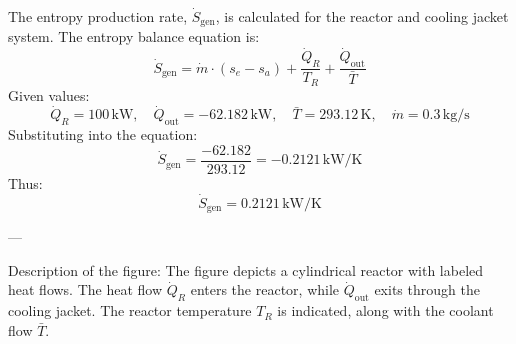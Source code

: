 The entropy production rate, \( \dot{S}_{\text{gen}} \), is calculated for the reactor and cooling jacket system. The entropy balance equation is:  
\[
\dot{S}_{\text{gen}} = \dot{m} \cdot (s_e - s_a) + \frac{\dot{Q}_R}{T_R} + \frac{\dot{Q}_{\text{out}}}{\bar{T}}
\]  
Given values:  
\[
\dot{Q}_R = 100 \, \text{kW}, \quad \dot{Q}_{\text{out}} = -62.182 \, \text{kW}, \quad \bar{T} = 293.12 \, \text{K}, \quad \dot{m} = 0.3 \, \text{kg/s}
\]  
Substituting into the equation:  
\[
\dot{S}_{\text{gen}} = \frac{-62.182}{293.12} = -0.2121 \, \text{kW/K}
\]  
Thus:  
\[
\dot{S}_{\text{gen}} = 0.2121 \, \text{kW/K}
\]  

---

Description of the figure:  
The figure depicts a cylindrical reactor with labeled heat flows. The heat flow \( \dot{Q}_R \) enters the reactor, while \( \dot{Q}_{\text{out}} \) exits through the cooling jacket. The reactor temperature \( T_R \) is indicated, along with the coolant flow \( \bar{T} \).
